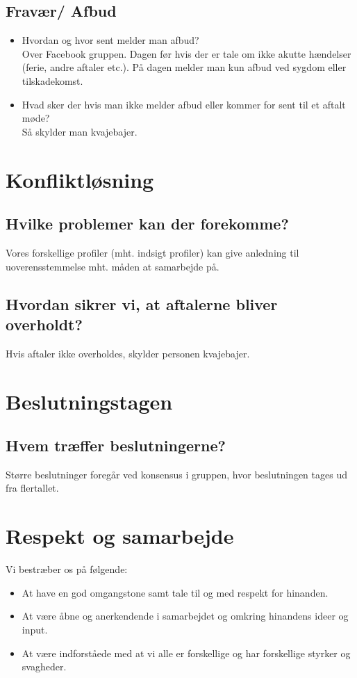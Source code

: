 \documentclass[a4paper,12pt]{article}
\begin{document}
\subsection*{Fravær/ Afbud}
\begin{itemize}
    \item Hvordan og hvor sent melder man afbud? \\
    Over Facebook gruppen. Dagen før hvis der er tale om ikke akutte hændelser (ferie, andre aftaler etc.). På dagen melder man kun afbud ved sygdom eller tilskadekomst.
    \item Hvad sker der hvis man ikke melder afbud eller kommer for sent til et aftalt møde? \\
    Så skylder man kvajebajer.
\end{itemize}

\section*{Konfliktløsning}
\subsection*{Hvilke problemer kan der forekomme?}
Vores forskellige profiler (mht. indsigt profiler) kan give anledning til uoverensstemmelse mht. måden at samarbejde på.

\subsection*{Hvordan sikrer vi, at aftalerne bliver overholdt?}
Hvis aftaler ikke overholdes, skylder personen kvajebajer.

\section*{Beslutningstagen}
\subsection*{Hvem træffer beslutningerne?}
Større beslutninger foregår ved konsensus i gruppen, hvor beslutningen tages ud fra flertallet.

\section*{Respekt og samarbejde}
Vi bestræber os på følgende:
\begin{itemize}
    \item At have en god omgangstone samt tale til og med respekt for hinanden.
    \item At være åbne og anerkendende i samarbejdet og omkring hinandens ideer og input.
    \item At være indforståede med at vi alle er forskellige og har forskellige styrker og svagheder.
\end{itemize}
\end{document}

